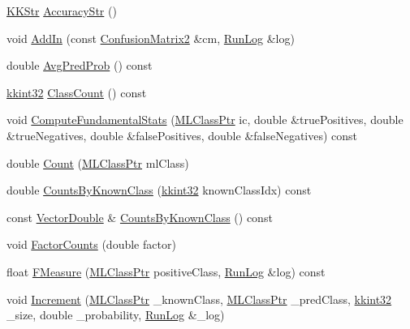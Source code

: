 \begin{DoxyCompactItemize}
\hyperlink{class_k_k_b_1_1_k_k_str}{K\+K\+Str} \hyperlink{class_k_k_m_l_l_1_1_confusion_matrix2_a344dbdc79eca43f4fc2fff7eef96a95b}{Accuracy\+Str} ()
\item 
void \hyperlink{class_k_k_m_l_l_1_1_confusion_matrix2_a0c1a6eba13b1faa33aa922a46dfe0e21}{Add\+In} (const \hyperlink{class_k_k_m_l_l_1_1_confusion_matrix2}{Confusion\+Matrix2} \&cm, \hyperlink{class_k_k_b_1_1_run_log}{Run\+Log} \&log)
\item 
double \hyperlink{class_k_k_m_l_l_1_1_confusion_matrix2_a34b983c3312da01ef7d6373663704958}{Avg\+Pred\+Prob} () const 
\item 
\hyperlink{namespace_k_k_b_a8fa4952cc84fda1de4bec1fbdd8d5b1b}{kkint32} \hyperlink{class_k_k_m_l_l_1_1_confusion_matrix2_a2ee79aa0b27fd0ff2ea5616492e14efe}{Class\+Count} () const 
\item 
void \hyperlink{class_k_k_m_l_l_1_1_confusion_matrix2_a9c395af8e6cffa32f8bece8070587eda}{Compute\+Fundamental\+Stats} (\hyperlink{namespace_k_k_m_l_l_ac272393853d59e72e8456f14cd6d8c23}{M\+L\+Class\+Ptr} ic, double \&true\+Positives, double \&true\+Negatives, double \&false\+Positives, double \&false\+Negatives) const 
\item 
double \hyperlink{class_k_k_m_l_l_1_1_confusion_matrix2_ac29266aab7783f07aa9efece3b7b5d8e}{Count} (\hyperlink{namespace_k_k_m_l_l_ac272393853d59e72e8456f14cd6d8c23}{M\+L\+Class\+Ptr} ml\+Class)
\item 
double \hyperlink{class_k_k_m_l_l_1_1_confusion_matrix2_a7c9f2b6099bf35363288e62617edb498}{Counts\+By\+Known\+Class} (\hyperlink{namespace_k_k_b_a8fa4952cc84fda1de4bec1fbdd8d5b1b}{kkint32} known\+Class\+Idx) const 
\item 
const \hyperlink{namespace_k_k_b_a5906c207479607e5f450434095914a41}{Vector\+Double} \& \hyperlink{class_k_k_m_l_l_1_1_confusion_matrix2_ac565b97549d5af643c24aa61391eb454}{Counts\+By\+Known\+Class} () const 
\item 
void \hyperlink{class_k_k_m_l_l_1_1_confusion_matrix2_ac4bdf6a0bea12fd748dc0d05e1844f29}{Factor\+Counts} (double factor)
\item 
float \hyperlink{class_k_k_m_l_l_1_1_confusion_matrix2_a55f2dbba255de8a868007a0d7432b52f}{F\+Measure} (\hyperlink{namespace_k_k_m_l_l_ac272393853d59e72e8456f14cd6d8c23}{M\+L\+Class\+Ptr} positive\+Class, \hyperlink{class_k_k_b_1_1_run_log}{Run\+Log} \&log) const 
\item 
void \hyperlink{class_k_k_m_l_l_1_1_confusion_matrix2_afeb6ab7435a722c16eae4e8e91e3cdd3}{Increment} (\hyperlink{namespace_k_k_m_l_l_ac272393853d59e72e8456f14cd6d8c23}{M\+L\+Class\+Ptr} \+\_\+known\+Class, \hyperlink{namespace_k_k_m_l_l_ac272393853d59e72e8456f14cd6d8c23}{M\+L\+Class\+Ptr} \+\_\+pred\+Class, \hyperlink{namespace_k_k_b_a8fa4952cc84fda1de4bec1fbdd8d5b1b}{kkint32} \+\_\+size, double \+\_\+probability, \hyperlink{class_k_k_b_1_1_run_log}{Run\+Log} \&\+\_\+log)

\end{DoxyCompactItemize}
